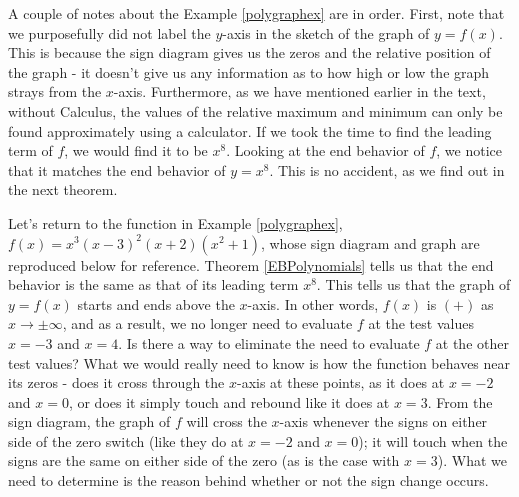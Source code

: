 A couple of notes about the Example \ref{polygraphex} are in order.  First, note that we purposefully did not label the $y$-axis in the sketch of the graph of $y=f(x)$.  This is because the sign diagram gives us the zeros and the relative position of the graph - it doesn't give us any information as to how high or low the graph strays from the $x$-axis.  Furthermore, as we have mentioned earlier in the text, without Calculus, the values of the relative maximum and minimum can only be found approximately using a calculator.  If we took the time to find the leading term of $f$, we would find it to be $x^8$.  Looking at the end behavior of $f$, we notice that it matches the end behavior of $y=x^8$.  This is no accident, as we find out in the next theorem.

\medskip


Let's return to the function in Example \ref{polygraphex}, $f(x) = x^3 (x-3)^2 (x+2)\left(x^2+1\right)$, whose sign diagram and graph are reproduced below for reference.  Theorem \ref{EBPolynomials} tells us that the end behavior is the same as that of its leading term $x^{8}$.  This tells us that the graph of $y=f(x)$ starts and ends above the $x$-axis.  In other words, $f(x)$ is $(+)$ as $x \rightarrow \pm \infty$, and as a result, we no longer need to evaluate $f$ at the test values $x=-3$ and $x=4$.  Is there a way to eliminate the need to evaluate $f$ at the other test values?  What we would really need to know is how the function behaves near its zeros - does it cross through the $x$-axis at these points, as it does at $x=-2$ and $x=0$, or does it simply touch and rebound like it does at $x=3$.  From the sign diagram, the graph of $f$ will cross the $x$-axis whenever the signs on either side of the zero switch (like they do at $x=-2$ and $x=0$);  it will touch when the signs are the same on either side of the zero (as is the case with $x=3$). What we need to determine is the reason behind whether or not the sign change occurs.

